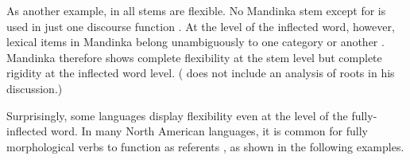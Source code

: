 As another example, in  all stems are flexible. No Mandinka stem except for   is used in just one discourse function \parencite[46]{Creissels2017}. At the level of the inflected word, however, lexical items in Mandinka belong unambiguously to one category or another \parencite[37]{Creissels2017}. Mandinka therefore shows complete flexibility at the stem level but complete rigidity at the inflected word level. (\citeauthor{Creissels2017} does not include an analysis of roots in his discussion.)

Surprisingly, some languages display flexibility even at the level of the fully-inflected word. In many North American languages, it is common for fully morphological verbs to function as referents \parencite{Hieberfc}, as shown in the following examples.

